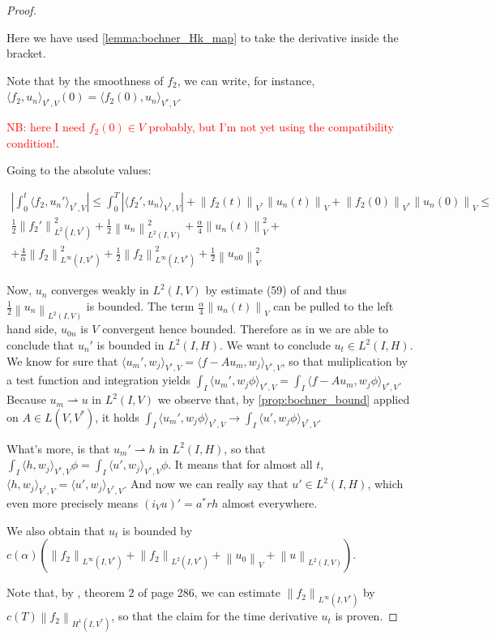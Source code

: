 \documentclass[english,a4paper,10pt,oneside]{scrbook}	%
\theoremstyle{break}
\newenvironment{mproof}[1][\proofname]{%
  \begin{proof}[#1]$ $\par\nobreak\ignorespaces
}{%
  \end{proof}
}
\renewcommand*{\proofname}{Proof}
\theoremstyle{remark}
\newcommand{\norm}[1]{\left\lVert#1\right\rVert}
\newcommand{\VN}[1]{\norm{#1}_{V}}
\newcommand{\VSN}[1]{\norm{#1}_{V^*}}
\newcommand{\tred}[1]{\textcolor{red}{#1}}
\begin{document}
\begin{mproof}
Here we have used \cref{lemma:bochner_Hk_map} to take the derivative inside the bracket.

Note that by the smoothness of $f_2$, we can write, for instance, $\langle f_2,u_n \rangle_{V^*,V}(0) = \langle f_2(0),u_n \rangle_{V^*,V}$.

\tred{NB: here I need $f_2(0) \in V$ probably, but I'm not yet using the compatibility condition!}.

Going to the absolute values:

\begin{align*}
	\left | \int_0^t \langle f_2,u_n' \rangle_{V^*,V}\right | \leq 
	\int_0^T |\langle f_2',u_n \rangle_{V^*,V}|+ \VSN{f_2(t)}\VN{u_n(t)}+\VSN{f_2(0)}\VN{u_n(0)} \leq \\
	\frac{1}{2}\norm{f_2'}_{L^2(I,V^*)}^2 + \frac{1}{2}\norm{u_n}_{L^2(I,V)}^2 + \frac{\alpha}{4}\VN{u_n(t)}^2 +\\
	+ \frac{4}{\alpha}\norm{f_2}_{L^\infty(I,V^*)}^2+ \frac{1}{2}\norm{f_2}_{L^\infty(I,V^*)}^2+\frac{1}{2}\VN{u_{n0}}^2
\end{align*}

Now, $u_n$ converges weakly in $L^2(I,V)$ by estimate (59) of \cite{gilardi} and thus $\frac{1}{2}\norm{u_n}_{L^2(I,V)}$ is bounded. The term $\frac{\alpha}{4}\VN{u_n(t)}$ can be pulled to the left hand side, $u_{0n}$ is $V$ convergent hence bounded. Therefore as in \cite{gilardi} we are able to conclude that $u_n'$ is bounded in $L^2(I,H)$. We want to conclude $u_t \in L^2(I,H)$. We know for sure that $\langle u_m',w_j\rangle_{V^*,V}=\langle f-Au_m,w_j\rangle_{V^*,V}$, so that muliplication by a test function and integration yields $\int_I \langle u_m',w_j\phi\rangle_{V^*,V}=\int_I \langle f-Au_m,w_j\phi\rangle_{V^*,V}$. Because $u_m\rightharpoonup u$ in $L^2(I,V)$ we observe that, by \cref{prop:bochner_bound} applied on $A \in L(V,V^*)$, it holds $\int_I \langle u_m',w_j\phi\rangle_{V^*,V}\rightarrow \int_I \langle u',w_j\phi\rangle_{V^*,V}$.

What's more, is that $u_m' \rightharpoonup h$ in $L^2(I,H)$, so that $\int_I \langle h ,w_j\rangle_{V^*,V}\phi = \int_I \langle u',w_j\rangle_{V^*,V}\phi$. It means that for almost all $t$, $\langle h ,w_j\rangle_{V^*,V} = \langle u',w_j\rangle_{V^*,V}$. And now we can really say that $u' \in L^2(I,H)$, which even more precisely means $(i_Vu)' = a^* r h$ almost everywhere.

We also obtain that $u_t$ is bounded by $c(\alpha)(\norm{f_2}_{L^\infty(I,V^*)}+\norm{f_2}_{L^2(I,V^*)}+\VN{u_0}+\norm{u}_{L^2(I,V)})$.

Note that, by \cite{evans}, theorem 2 of page 286, we can estimate $\norm{f_2}_{L^\infty(I,V^*)}$ by $c(T)\norm{f_2}_{H^1(I,V^*)}$, so that the claim for the time derivative $u_t$ is proven.

\end{mproof}
\end{document}

